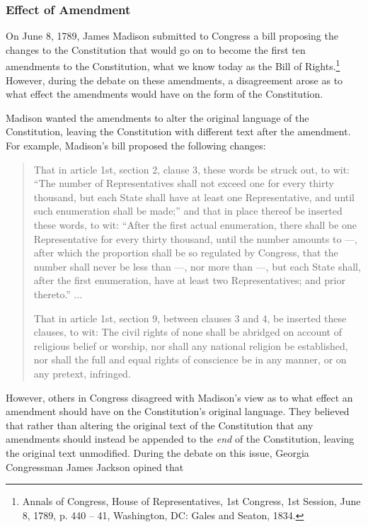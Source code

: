 \subsubsection{Effect of Amendment}

On June 8, 1789, James Madison submitted to Congress a bill proposing the changes to the Constitution that would go on to become the first ten amendments to the Constitution, what we know today as the Bill of Rights.\footnote{Annals of Congress, House of Representatives, 1st Congress, 1st Session, June 8, 1789, p. 440 -- 41, Washington, DC:  Gales and Seaton, 1834.}
However, during the debate on these amendments, a disagreement arose as to what effect the amendments would have on the form of the Constitution.

Madison wanted the amendments to alter the original language of the Constitution, leaving the Constitution with different text after the amendment.  For example, Madison's bill proposed the following changes:

\begin{quote}
That in article 1st, section 2, clause 3, these words be struck out, to wit: ``The number of Representatives shall not exceed one for every thirty thousand, but each State shall have at least one Representative, and until such enumeration shall be made;'' and that in place thereof be inserted these words, to wit: ``After the first actual enumeration, there shall be one Representative for every thirty thousand, until the number amounts to ---,  after which the proportion shall be so regulated by Congress, that the  number shall never be less than ---, nor more than ---, but each State shall, after the first enumeration, have at least two Representatives; and prior thereto.'' ...

That in article 1st, section 9, between clauses 3 and 4, be inserted these clauses, to wit: The civil rights of none shall be abridged on account of religious belief or worship, nor shall any national religion be established, nor shall the full and equal rights of conscience be in any manner, or on any pretext, infringed.
\end{quote}

However, others in Congress disagreed with Madison's view as to what effect an amendment should have on the Constitution's original language.  They believed that rather than altering the original text of the Constitution that any amendments should instead be appended to the \textit{end} of the Constitution, leaving the original text unmodified.  During the debate on this issue, Georgia Congressman James Jackson opined that

